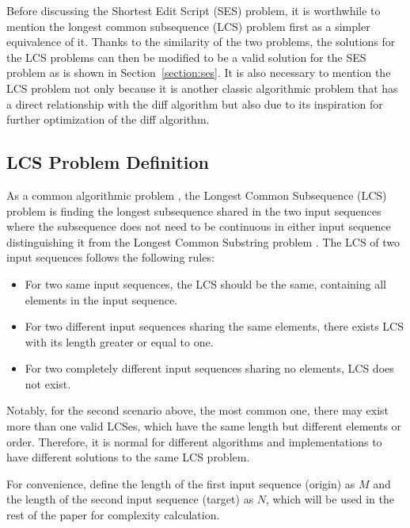\documentclass[sigplan,screen]{acmart}
\begin{document}
Before discussing the Shortest Edit Script (SES) problem, it is worthwhile to mention the longest common subsequence (LCS) problem first as a simpler equivalence of it. Thanks to the similarity of the two problems, the solutions for the LCS problems can then be modified to be a valid solution for the SES problem as is shown in Section~\ref{section:ses}. It is also necessary to mention the LCS problem not only because it is another classic algorithmic problem that has a direct relationship with the diff algorithm but also due to its inspiration for further optimization of the diff algorithm.

\subsection{LCS Problem Definition}
\label{section:lcs-def}

As a common algorithmic problem \cite{crochemoreLongestCommonSubstring2017}, the Longest Common Subsequence (LCS) problem is finding the longest subsequence shared in the two input sequences where the subsequence does not need to be continuous in either input sequence distinguishing it from the Longest Common Substring problem \cite{crochemoreLongestCommonSubstring2017}. The LCS of two input sequences follows the following rules:

\begin{itemize}
\item For two same input sequences, the LCS should be the same, containing all elements in the input sequence.
\item For two different input sequences sharing the same elements, there exists LCS with its length greater or equal to one.
\item For two completely different input sequences sharing no elements, LCS does not exist.
\end{itemize}

Notably, for the second scenario above, the most common one, there may exist more than one valid LCSes, which have the same length but different elements or order. Therefore, it is normal for different algorithms and implementations to have different solutions to the same LCS problem. \cite{bergrothSurveyLongestCommon2000, hirschbergAlgorithmsLongestCommon1977, hirschbergLinearSpaceAlgorithm1975, lijuAlgorithmDeriveShortest2022, masekFasterAlgorithmComputing1980, myersAnONDDifference1986, patersonLongestCommonSubsequences1994}

For convenience, define the length of the first input sequence (origin) as $M$ and the length of the second input sequence (target) as $N$, which will be used in the rest of the paper for complexity calculation.
\end{document}

